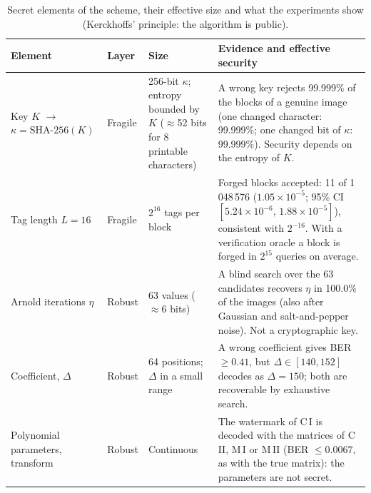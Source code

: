 \begin{table}[t]
\centering
\caption{Secret elements of the scheme, their effective size and what the experiments show (Kerckhoffs' principle: the algorithm is public).}
\label{tab:keyspace}
\footnotesize
\setlength{\tabcolsep}{3pt}
\begin{tabular}{p{2.3cm}p{1.1cm}p{2.5cm}p{6.1cm}}
\toprule
Element & Layer & Size & Evidence and effective security \\
\midrule
Key $K$ $\to$ $\kappa=\mathrm{SHA\text{-}256}(K)$ & Fragile & 256-bit $\kappa$; entropy bounded by $K$ ($\approx$52 bits for 8 printable characters) & A wrong key rejects 99.999\% of the blocks of a genuine image (one changed character: 99.999\%; one changed bit of $\kappa$: 99.999\%). Security depends on the entropy of $K$. \\
Tag length $L=16$ & Fragile & $2^{16}$ tags per block & Forged blocks accepted: 11 of 1\,048\,576 ($1.05\times10^{-5}$; 95\% CI $[5.24\times10^{-6},\,1.88\times10^{-5}]$), consistent with $2^{-16}$. With a verification oracle a block is forged in $2^{15}$ queries on average. \\
Arnold iterations $\eta$ & Robust & 63 values ($\approx$6 bits) & A blind search over the 63 candidates recovers $\eta$ in 100.0\% of the images (also after Gaussian and salt-and-pepper noise). Not a cryptographic key. \\
Coefficient, $\Delta$ & Robust & 64 positions; $\Delta$ in a small range & A wrong coefficient gives BER $\geq0.41$, but $\Delta\in[140,152]$ decodes as $\Delta=150$; both are recoverable by exhaustive search. \\
Polynomial parameters, transform & Robust & Continuous & The watermark of C\,I is decoded with the matrices of C\,II, M\,I or M\,II (BER $\leq0.0067$, as with the true matrix): the parameters are not secret. \\
\bottomrule
\end{tabular}
\end{table}
